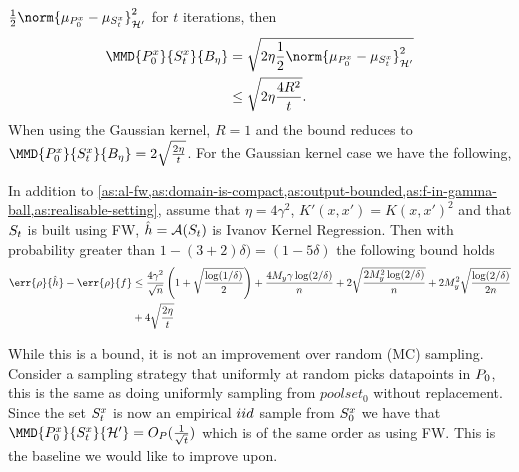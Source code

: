 \(\frac{1}{2}\norm{\mu_{\poolsetx_0} - \mu_{\trainsetx_{t}}}_{\rkhs{H}'}^2\) for
\(t\) iterations, then
\begin{align*}
  \label{align:fw-worst-bound-on-mmd}
  \MMD{\poolsetx_{0}}{\trainsetx_{t}}{B_{\eta}} & = \sqrt{2\eta\frac{1}{2}\norm{\mu_{\poolsetx_0} - \mu_{\trainsetx_{t}}}_{\rkhs{H}'}^2} \\
                                                & \leq \sqrt{2\eta \frac{4R^2}{t}}.
\end{align*}
When using the Gaussian kernel, \(R = 1\) and the bound reduces to
\(\MMD{\poolsetx_{0}}{\trainsetx_{t}}{B_{\eta}} = 2\sqrt{\frac{2\eta}{t}}\). For
the Gaussian kernel case we have the following,
\begin{theorem}
  \label{al:worst-fw-generalisation-bound-no-additional-assumptions}
  In addition to \cref{as:al-fw,as:domain-is-compact,as:output-bounded,as:f-in-gamma-ball,as:realisable-setting}, assume that \(\eta = 4\gamma^{2}\), \(K'(x, x') = K(x,
  x')^{2}\) and that \(S_t\) is built using FW, \(\hat{h} = \mathcal{A}(S_t)\) is Ivanov
  Kernel Regression. Then with probability greater than \(1 - (3 + 2)\delta) = (1 - 5\delta)\) the following bound holds
  \begin{align*}
    \err{\rho}{\hat{h}} - \err{\rho}{f} & \leq \frac{4 \gamma^2}{\sqrt{n}}\left(1 + \sqrt{\frac{\log(1/\delta)}{2}} \right) + \frac{4 M_y \gamma \log(2/\delta)}{n} + 2\sqrt{\frac{2 M_y^2 \log(2/\delta)}{n}} + 2M_y^2\sqrt{\frac{\log(2/\delta)}{2n}} \\
                                        & + 4\sqrt{\frac{2\eta}{t}}
  \end{align*}
\end{theorem}

While this is a bound, it is not an improvement over random (MC) sampling. Consider a
sampling strategy that uniformly at random picks datapoints in \(P_0\),
this is the same as doing uniformly sampling from \(poolset_0\) without
replacement. Since the set \(S^x_{t}\) is now an empirical \(iid\)
sample from \(S^x_{0}\) we have that \(\MMD{\poolsetx_{0}}{\trainsetx_{t}}{\rkhs{H}'} = O_{P}(\frac{1}{\sqrt{t}})\)
\cite{tolstikhin17_minim_estim_kernel_mean_embed} which is of the same order as
using FW. This is the baseline we would like to improve upon.

